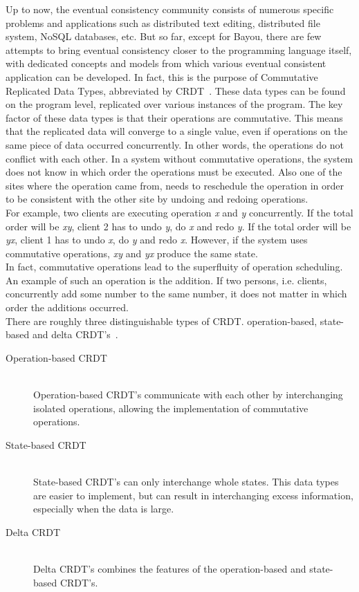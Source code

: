 \documentclass[a4paper,12pt]{report}
\begin{document}
Up to now, the eventual consistency community consists of numerous specific problems and applications such as distributed text editing, distributed file system, NoSQL databases, etc. But so far, except for Bayou, there are few attempts to bring eventual consistency closer to the programming language itself, with dedicated concepts and models from which various eventual consistent application can be developed. In fact, this is the purpose of Commutative Replicated Data Types, abbreviated by CRDT~\cite{CRDT}. These data types can be found on the program level, replicated over various instances of the program. The key factor of these data types is that their operations are commutative. This means that the replicated data will converge to a single value, even if operations on the same piece of data occurred concurrently. In other words, the operations do not conflict with each other. In a system without commutative operations, the system does not know in which order the operations must be executed. Also one of the sites where the operation came from, needs to reschedule the operation in order to be consistent with the other site by undoing and redoing operations. \\
\indent For example, two clients are executing operation \textit{x} and \textit{y} concurrently. If the total order will be \textit{xy}, client 2 has to undo \textit{y}, do \textit{x} and redo \textit{y}. If the total order will be \textit{yx}, client 1 has to undo \textit{x}, do \textit{y} and redo \textit{x}. However, if the system uses commutative operations, \textit{xy} and \textit{yx} produce the same state. \\
In fact, commutative operations lead to the superfluity of operation scheduling. An example of such an operation is the addition. If two persons, i.e. clients, concurrently add some number to the same number, it does not matter in which order the additions occurred. \\
There are roughly three distinguishable types of CRDT. operation-based, state-based and delta CRDT's~\cite{CRDT2}. 

\begin{description}
    \item[Operation-based CRDT] \hfill \\Operation-based CRDT's communicate with each other by interchanging isolated operations, allowing the implementation of commutative operations.
    \item[State-based CRDT] \hfill \\State-based CRDT's can only interchange whole states. This data types are easier to implement, but can result in interchanging excess information, especially when the data is large.\\
    \item[Delta CRDT] \hfill \\Delta CRDT's combines the features of the operation-based and state-based CRDT's. 
\end{description}
\end{document}
